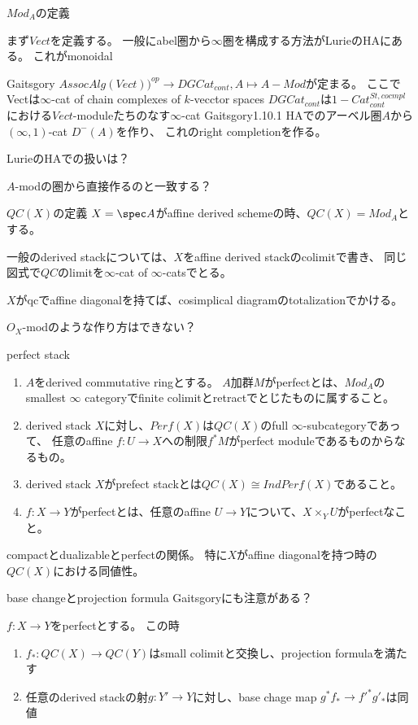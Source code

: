\documentclass[dvipdfmx]{beamer}
\begin{document}
\begin{frame}{$Mod_A$の定義}

まず$Vect$を定義する。
一般にabel圏から$\infty$圏を構成する方法がLurieのHAにある。
これがmonoidal

Gaitsgory
$AssocAlg(Vect))^{op} \to DGCat_{cont}, A \mapsto A-Mod$が定まる。
ここでVectは$\infty$-cat of chain complexes of $k$-vecctor spaces
$DGCat_{cont}$は$1-Cat^{St, cocmpl}_{cont}$における$Vect$-moduleたちのなす$\infty$-cat
Gaitsgory1.10.1
HAでのアーベル圏$A$から$(\infty,1)$-cat $D^-(A)$を作り、
これのright completionを作る。

LurieのHAでの扱いは？

$A$-modの圏から直接作るのと一致する？
\end{frame}

\begin{frame}{$QC(X)$の定義}
$X=\spec A$がaffine derived schemeの時、$QC(X)=Mod_A$とする。

一般のderived stackについては、$X$をaffine derived stackのcolimitで書き、
同じ図式で$QC$のlimitを$\infty$-cat of $\infty$-catsでとる。

$X$がqcでaffine diagonalを持てば、cosimplical diagramのtotalizationでかける。

$O_X$-modのような作り方はできない？
\end{frame}

\begin{frame}{perfect stack}
\begin{dfn}
\begin{enumerate}
\item $A$をderived commutative ringとする。
$A$加群$M$がperfectとは、$Mod_A$のsmallest $\infty$ categoryでfinite colimitとretractでとじたものに属すること。
\item derived stack $X$に対し、$Perf(X)$は$QC(X)$のfull $\infty$-subcategoryであって、
任意のaffine $f:U \to X$への制限$f^*M$がperfect moduleであるものからなるもの。
\item derived stack $X$がprefect stackとは$QC(X)\cong IndPerf(X)$であること。
\item $f:X \to Y$がperfectとは、任意のaffine $U \to Y$について、$X \times_Y U$がperfectなこと。
\end{enumerate}
\end{dfn}

compactとdualizableとperfectの関係。
特に$X$がaffine diagonalを持つ時の$QC(X)$における同値性。
\end{frame}

\begin{frame}{base changeとprojection formula}
Gaitsgoryにも注意がある？

\begin{prop}
$f:X \to Y$をperfectとする。
この時
\begin{enumerate}
\item $f_*:QC(X) \to QC(Y)$はsmall colimitと交換し、projection formulaを満たす
\item 任意のderived stackの射$g:Y' \to Y$に対し、base chage map $g^*f_* \to f'^*g'_*$は同値
\end{enumerate}
\end{prop}
\end{frame}
\end{document}
